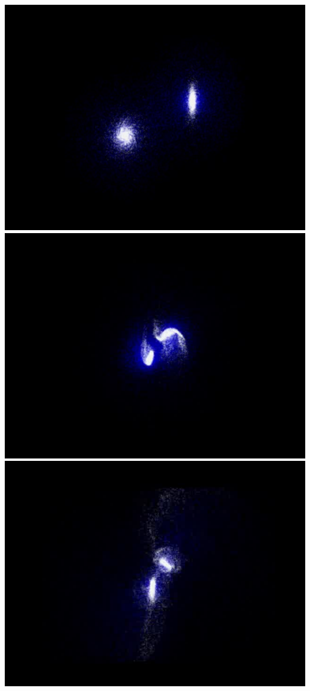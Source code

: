 \documentclass{article}
\begin{document}
\includegraphics[scale=0.4]{frame6}
\includegraphics[scale=0.4]{frame11}
\includegraphics[scale=0.4]{frame17}
\end{document}
